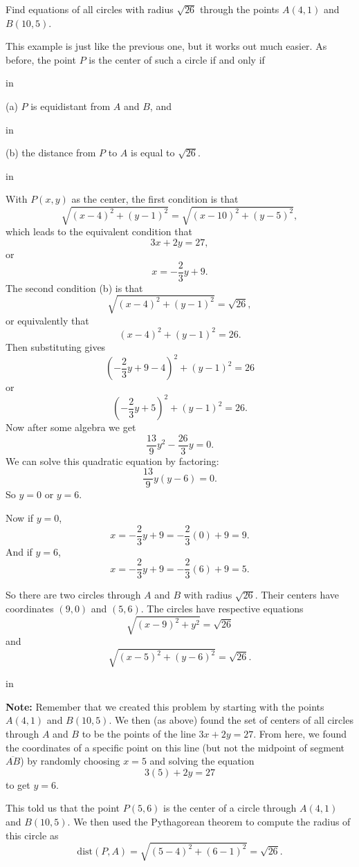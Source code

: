 \documentclass{ximera}
\newcommand{\pskip}{\vskip 0.1 in}
\begin{document}
\begin{example} \label{Ex5a}
Find equations of all circles with radius $\sqrt{26}$ through the points $A(4,1)$ and $B(10,5)$.

\begin{explanation}
This example is just like the previous one, but it works out much easier. As before, the point $P$ is the center of such a circle if and only if

\pskip

(a) $P$ is equidistant from $A$ and $B$, and 

\pskip
 
(b) the distance from $P$ to $A$ is equal to $\sqrt{26}$. 

\pskip

With $P(x,y)$ as the center, the first condition is that
\[
  \sqrt{(x-4)^2 + (y-1)^2} = \sqrt{(x-10)^2+(y-5)^2} ,
\]
 which leads to the equivalent condition that
\[
   3x + 2y = 27 , 
\]
or 
\[
    x = -\frac{2}{3}y + 9 .
\]
The second condition (b) is that
\[
   \sqrt{(x-4)^2 + (y-1)^2} =\sqrt{26} ,
\]
or equivalently that
\[
   (x-4)^2 + (y-1)^2 = 26.
\]
Then substituting gives
\[
    \left( -\frac{2}{3}y+9-4 \right)^2 + (y-1)^2 = 26
\]
or
\[
    \left( -\frac{2}{3}y+5 \right)^2 + (y-1)^2 = 26 .
\]
Now after some algebra we get
\[
   \frac{13}{9}y^2 - \frac{26}{3}y = 0.
\]
We can solve this quadratic equation by factoring:
\[
 \frac{13}{9}y \left(  y-6   \right) = 0 .
\]
So $y=0$ or $y=6$.

Now if $y=0$, 
\[
   x = -\frac{2}{3}y + 9 = -\frac{2}{3}(0) + 9 = 9 .
\]
And if $y=6$, 
\[
x = -\frac{2}{3}y + 9 = -\frac{2}{3}(6) + 9 = 5 .
\]

So there are two circles through $A$ and $B$ with radius $\sqrt{26}$. Their centers have coordinates $(9,0)$ and $(5,6)$. The circles have respective equations
\[
  \sqrt{(x-9)^2 + y^2} =\sqrt{26}
\]
and
\[
\sqrt{(x-5)^2 + (y-6)^2} =\sqrt{26} .
\]

\pskip

{\bf Note:} Remember that we created this problem by starting with the points $A(4,1)$ and $B(10,5)$. We then (as above) found the set of centers of all circles through $A$ and $B$ to be the points of the line $3x+2y = 27$. From here, we found the coordinates of a specific point on this line (but not the midpoint of segment $\overline{AB}$) by  randomly choosing $x=5$ and solving the equation
\[
    3(5) + 2y = 27 
\]
to get  $y=6$.

This told us that the point $P(5,6)$ is the center of a circle through $A(4,1)$ and $B(10,5)$. We then used the Pythagorean theorem to compute the radius of this circle as
\[
  \text{dist}(P,A) = \sqrt{(5-4)^2 + (6-1)^2} = \sqrt{26} .
 \] 
\end{explanation}

\end{example}
\end{document}
